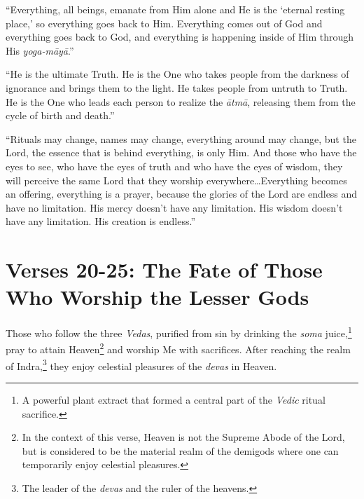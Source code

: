 \enquote{Everything, all beings, emanate from Him alone and He is the \enquote{eternal resting place,} so everything goes back to Him. Everything comes out of God and everything goes back to God, and everything is happening inside of Him through His \textit{yoga-māyā}.}

\enquote{He is the ultimate Truth. He is the One who takes people from the darkness of ignorance and brings them to the light. He takes people from untruth to Truth. He is the One who leads each person to realize the \textit{ātmā}, releasing them from the cycle of birth and death.}

\enquote{Rituals may change, names may change, everything around may change, but the Lord, the essence that is behind everything, is only Him. And those who have the eyes to see, who have the eyes of truth and who have the eyes of wisdom, they will perceive the same Lord that they worship everywhere\ldots Everything becomes an offering, everything is a prayer, because the glories of the Lord are endless and have no limitation. His mercy doesn’t have any limitation. His wisdom doesn’t have any limitation. His creation is endless.}

\section{Verses 20-25: The Fate of Those Who Worship the Lesser Gods}\label{sec-verses-20-25-the-fate-of-those-who-worship-the-lesser-gods}

{Those who follow the three \textit{Vedas}, purified from sin by drinking the \textit{soma} juice,\footnote{A powerful plant extract that formed a central part of the \textit{Vedic} ritual sacrifice.} pray to attain Heaven\footnote{In the context of this verse, Heaven is not the Supreme Abode of the Lord, but is considered to be the material realm of the demigods where one can temporarily enjoy celestial pleasures.} and worship Me with sacrifices. After reaching the realm of Indra,\footnote{The leader of the \textit{devas} and the ruler of the heavens.} they enjoy celestial pleasures of the \textit{devas} in Heaven.}


